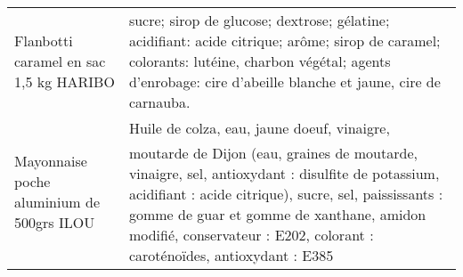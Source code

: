 \begin{longtable}{p{5cm}p{10cm}}
                                                                   Flanbotti caramel en sac 1,5 kg HARIBO &                                                                                                                                                                                                                                                                                                                                                                                                                                                                                                                                                                                                                                                                                                                                                                                                                             sucre; sirop de glucose; dextrose; gélatine; acidifiant: acide citrique; arôme; sirop de caramel; colorants: lutéine, charbon végétal; agents d'enrobage: cire d'abeille blanche et jaune, cire de carnauba. \\
                                                               Mayonnaise poche  aluminium de 500grs ILOU &                                                                                                                                                                                                                                                                                                                                                                                                                                                                                                                                                                                                                                                                                                            Huile de colza, eau, jaune doeuf, vinaigre, moutarde de Dijon (eau, graines de moutarde, vinaigre, sel, antioxydant : disulfite de potassium, acidifiant : acide citrique), sucre, sel,  paississants : gomme de guar et gomme de xanthane, amidon modifié, conservateur : E202, colorant : caroténoïdes, antioxydant : E385 \\

\end{longtable}
